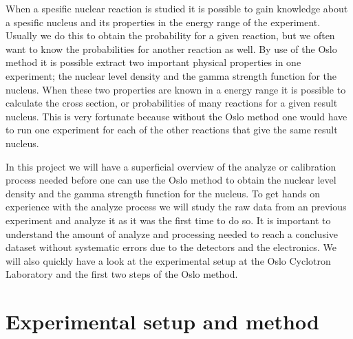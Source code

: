 \documentclass[11pt,a4wide]{article}
\begin{document}
When a spesific nuclear reaction is studied it is possible to gain knowledge about a spesific nucleus and its properties in the energy range of the experiment. Usually we do this to obtain the probability for a given reaction, but we often want to know the probabilities for another reaction as well. By use of the Oslo method it is possible extract two important physical properties in one experiment; the nuclear level density and the gamma strength function for the nucleus. When these two properties are known in a energy range it is possible to calculate the cross section, or probabilities of many reactions for a given result nucleus. This is very fortunate because without the Oslo method one would have to run one experiment for each of the other reactions that give the same result nucleus. 


In this project we will have a superficial overview of the analyze or calibration process needed before one can use the Oslo method to obtain the nuclear level density and the gamma strength function for the nucleus. To get hands on experience with the analyze process we will study the raw data from an previous experiment and analyze it as it was the first time to do so. It is important to understand the amount of analyze and processing needed to reach a conclusive dataset without systematic errors due to the detectors and the electronics.  We will also quickly have a look at the experimental setup at the Oslo Cyclotron Laboratory and the first two steps of the Oslo method. 


\section{Experimental setup and method}
\end{document}
